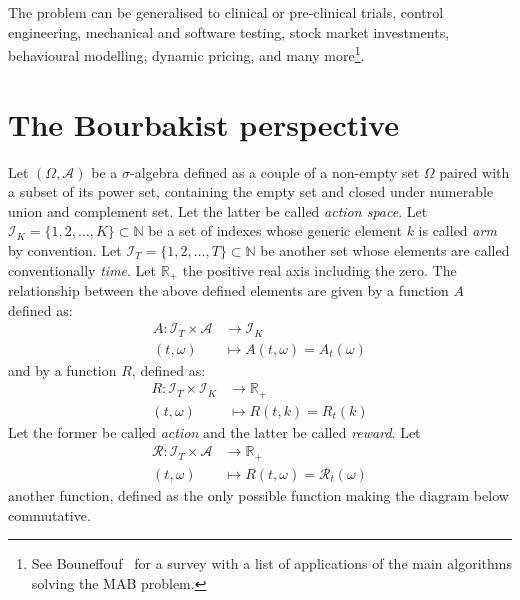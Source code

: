 \documentclass[]{scrartcl}
\begin{document}
The problem can be generalised to clinical or pre-clinical trials, control engineering, mechanical and software testing, stock market investments, behavioural modelling, dynamic pricing, and many more\footnote{See Bouneffouf~\cite{bf2019survey} for a survey with a list of applications of the main algorithms solving the MAB problem.}.

\section{The Bourbakist perspective}
\label{se:bourbaki_perspective}
Let $(\Omega, \mathcal{A})$ be a $\sigma$-algebra defined as a couple of a non-empty set $\Omega$ paired with a subset of its power set, containing the empty set and closed under numerable union and complement set. Let the latter be called \emph{action space}. Let $\mathcal{I}_{K} = \{1,2, \dots , K\} \subset \mathbb{N}$ be a set of indexes whose generic element $k$ is called \emph{arm} by convention. Let $\mathcal{I}_{T} = \{1,2, \dots , T\} \subset \mathbb{N}$ be another set whose elements are called conventionally \emph{time}. Let $\mathbb{R}_{+}$ the positive real axis including the zero. The relationship between the above defined elements are given by a function $A$ defined as:
\begin{align*}
    A : \mathcal{I}_T \times \mathcal{A} &\longrightarrow \mathcal{I}_K \\
        (t, \omega) &\longmapsto A(t, \omega) = A_t(\omega)
\end{align*}
and by a function $R$, defined as:
\begin{align*}
    R : \mathcal{I}_T \times \mathcal{I}_K &\longrightarrow \mathbb{R}_{+} \\
        (t, \omega) &\longmapsto R(t, k) = R_t(k)
\end{align*}
Let the former be called \emph{action} and the latter be called \emph{reward}. Let 
\begin{align*}
    \mathcal{R} : \mathcal{I}_T \times \mathcal{A} &\longrightarrow \mathbb{R}_{+} \\
        (t, \omega) &\longmapsto R(t, \omega) = \mathcal{R}_t(\omega)
\end{align*}
another function, defined as the only possible function making the diagram below commutative.
\end{document}
